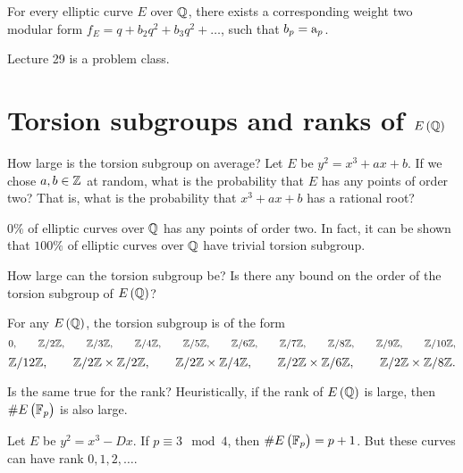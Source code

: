 \begin{theorem}
For every elliptic curve $ E $ over $ \mathbb{Q} $, there exists a corresponding weight two modular form $ f_E = q + b_2q^2 + b_3q^2 + \dots $, such that $ b_p = \mathrm{a}_p $.
\end{theorem}


Lecture 29 is a problem class.

\pagebreak

\section{Torsion subgroups and ranks of \texorpdfstring{$ E\br{\QQ} $}{E(Q)}}


How large is the torsion subgroup on average? Let $ E $ be $ y^2 = x^3 + ax + b $. If we chose $ a, b \in \mathbb{Z} $ at random, what is the probability that $ E $ has any points of order two? That is, what is the probability that $ x^3 + ax + b $ has a rational root?

\begin{proposition}
$ 0\% $ of elliptic curves over $ \mathbb{Q} $ has any points of order two. In fact, it can be shown that $ 100\% $ of elliptic curves over $ \mathbb{Q} $ have trivial torsion subgroup.
\end{proposition}

How large can the torsion subgroup be? Is there any bound on the order of the torsion subgroup of $ E\br{\QQ} $?

\begin{theorem}[Mazur 1977]
For any $ E\br{\QQ} $, the torsion subgroup is of the form
$$ 0, \qquad \mathbb{Z} / 2\mathbb{Z}, \qquad \mathbb{Z} / 3\mathbb{Z}, \qquad \mathbb{Z} / 4\mathbb{Z}, \qquad \mathbb{Z} / 5\mathbb{Z}, \qquad \mathbb{Z} / 6\mathbb{Z}, \qquad \mathbb{Z} / 7\mathbb{Z}, \qquad \mathbb{Z} / 8\mathbb{Z}, \qquad \mathbb{Z} / 9\mathbb{Z}, \qquad \mathbb{Z} / 10\mathbb{Z}, $$
$$ \mathbb{Z} / 12\mathbb{Z}, \qquad \mathbb{Z} / 2\mathbb{Z} \times \mathbb{Z} / 2\mathbb{Z}, \qquad \mathbb{Z} / 2\mathbb{Z} \times \mathbb{Z} / 4\mathbb{Z}, \qquad \mathbb{Z} / 2\mathbb{Z} \times \mathbb{Z} / 6\mathbb{Z}, \qquad \mathbb{Z} / 2\mathbb{Z} \times \mathbb{Z} / 8\mathbb{Z}. $$
\end{theorem}

Is the same true for the rank? Heuristically, if the rank of $ E\br{\QQ} $ is large, then $ \#E\br{\FF_p} $ is also large.

\begin{example}
Let $ E $ be $ y^2 = x^3 - Dx $. If $ p \equiv 3 \mod 4 $, then $ \#E\br{\FF_p} = p + 1 $. But these curves can have rank $ 0, 1, 2, \dots $.
\end{example}


